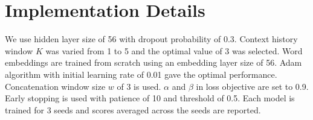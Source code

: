 


\section{Implementation Details}
\label{sec:implementation_f}

We use hidden layer size of 56 with dropout probability of 0.3. Context history window $K$ was varied from 1 to 5 and the optimal value of 3 was selected.
Word embeddings are trained from scratch using an embedding layer size of 56. Adam \cite{kingma2014adam} algorithm with initial learning rate of 0.01 gave the optimal performance. Concatenation window size $w$ of 3 is used. $\alpha$ and $\beta$ in loss objective are set to 0.9. Early stopping is used with patience of 10 and threshold of 0.5. Each model is trained for 3 seeds and scores averaged across the seeds are reported.